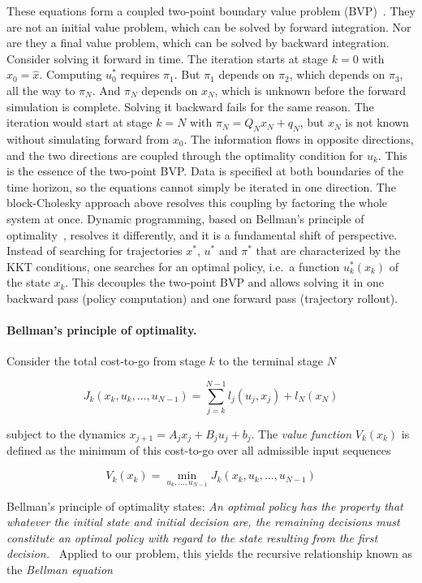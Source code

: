 These equations form a coupled two-point boundary value problem (BVP)~\cite{bryson1975applied}.
They are not an initial value problem, which can be solved by forward integration.
Nor are they a final value problem, which can be solved by backward integration.
Consider solving it forward in time.
The iteration starts at stage $k=0$ with $x_0 = \hat{x}$.
Computing $u_0^*$ requires $\pi_1$.
But $\pi_1$ depends on $\pi_2$, which depends on $\pi_3$, all the way to $\pi_N$.
And $\pi_N$ depends on $x_N$, which is unknown before the forward simulation is complete.
Solving it backward fails for the same reason.
The iteration would start at stage $k=N$ with $\pi_N = Q_N x_N + q_N$, but $x_N$ is not known without simulating forward from $x_0$.
The information flows in opposite directions, and the two directions are coupled through the optimality condition for $u_k$.
This is the essence of the two-point BVP.
Data is specified at both boundaries of the time horizon, so the equations cannot simply be iterated in one direction.
The block-Cholesky approach above resolves this coupling by factoring the whole system at once.
Dynamic programming, based on Bellman's principle of optimality~\cite{bellman1957dynamic}, resolves it differently, and it is a fundamental shift of perspective.
Instead of searching for trajectories $x^*$, $u^*$ and $\pi^*$ that are characterized by the KKT conditions,
one searches for an optimal policy, i.e.\ a function $u_k^*(x_k)$ of the state $x_k$.
This decouples the two-point BVP and allows solving it in one backward pass (policy computation) and one forward pass (trajectory rollout).

\paragraph{Bellman's principle of optimality.}
Consider the total cost-to-go from stage $k$ to the terminal stage $N$

\[
J_k(x_k, u_k, \ldots, u_{N-1}) = \sum_{j=k}^{N-1} l_j(u_j, x_j) + l_N(x_N)
\]

subject to the dynamics $x_{j+1} = A_j x_j + B_j u_j + b_j$.
The \textit{value function} $V_k(x_k)$ is defined as the minimum of this cost-to-go over all admissible input sequences

\[
V_k(x_k) = \min_{u_k, \ldots, u_{N-1}} J_k(x_k, u_k, \ldots, u_{N-1})
\]

Bellman's principle of optimality states:
\textit{An optimal policy has the property that whatever the initial state and initial decision are, the remaining decisions must constitute an optimal policy with regard to the state resulting from the first decision.}~\cite[p.~83]{bellman1957dynamic}
Applied to our problem, this yields the recursive relationship known as the \textit{Bellman equation}~\cite{bertsekas1995dynamic}

